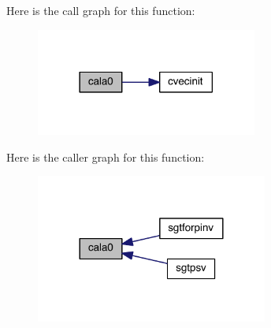 Here is the call graph for this function\-:\nopagebreak
\begin{figure}[H]
\begin{center}
\leavevmode
\includegraphics[width=206pt]{calmat_8f90_a2cacc65e55dad87e63c5b94bda58e6ea_cgraph}
\end{center}
\end{figure}




Here is the caller graph for this function\-:\nopagebreak
\begin{figure}[H]
\begin{center}
\leavevmode
\includegraphics[width=216pt]{calmat_8f90_a2cacc65e55dad87e63c5b94bda58e6ea_icgraph}
\end{center}
\end{figure}


